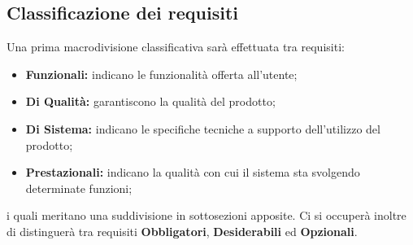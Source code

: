 \subsection{Classificazione dei requisiti}
Una prima macrodivisione classificativa sarà effettuata tra requisiti:
\begin{itemize}
    \item \textbf{Funzionali: }indicano le funzionalità offerta all'utente;
    \item \textbf{Di Qualità: }garantiscono la qualità del prodotto;
    \item \textbf{Di Sistema: }indicano le specifiche tecniche a supporto dell'utilizzo del prodotto;
    \item \textbf{Prestazionali: }indicano la qualità con cui il sistema sta svolgendo determinate funzioni;
\end{itemize}
i quali meritano una suddivisione in sottosezioni apposite.
Ci si occuperà inoltre di distinguerà tra requisiti \textbf{Obbligatori}, \textbf{Desiderabili} ed \textbf{Opzionali}.

